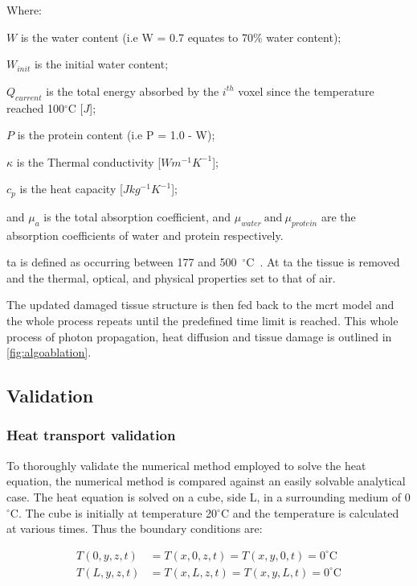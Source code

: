 \noindent Where:

\indent $W$ is the water content (i.e W = 0.7 equates to 70\% water content);

\indent $W_{init}$ is the initial water content;

\indent $Q_{current}$ is the total energy absorbed by the $i^{th}$ voxel since the temperature reached 100$^{\circ}$C [$J$];

\indent $P$ is the protein content (i.e P = 1.0 - W);

\indent $\kappa$ is the Thermal conductivity [$W m^{-1} K^{-1}$];

\indent $c_p$ is the heat capacity [$J kg^{-1} K^{-1}$];

\indent and $\mu_a$ is the total absorption coefficient, and $\mu_{water}\ \text{and}\ \mu_{protein}$ are the absorption coefficients of water and protein respectively.

\medskip

\gls*{ta}  is defined as occurring between 177 and 500~$^{\circ}$C~\cite{gerstmann1994char,mckenzie1986three,sagi1992heating}. At \gls*{ta} the tissue is removed and the thermal, optical, and physical properties set to that of air.

The updated damaged tissue structure is then fed back to the \gls*{mcrt} model and the whole process repeats until the predefined time limit is reached. This whole process of photon propagation, heat diffusion and tissue damage is outlined in \cref{fig:algoablation}.

\subsection{Validation}

\subsubsection*{Heat transport validation}

To thoroughly validate the numerical method employed to solve the heat equation, the numerical method is compared against an easily solvable analytical case. The heat equation is solved on a cube, side L, in a surrounding medium of 0$^{\circ}$C. The cube is initially at temperature 20$^{\circ}$C and the temperature is calculated at various times. Thus the boundary conditions are:

\begin{align}
T(0,y,z,t)&=T(x,0,z,t)=T(x,y,0,t)=0^{\circ}\text{C} \label{eqn:bc1}\\
T(L,y,z,t)&=T(x,L,z,t)=T(x,y,L,t)=0^{\circ}\text{C} \label{eqn:bc2}
\end{align}

